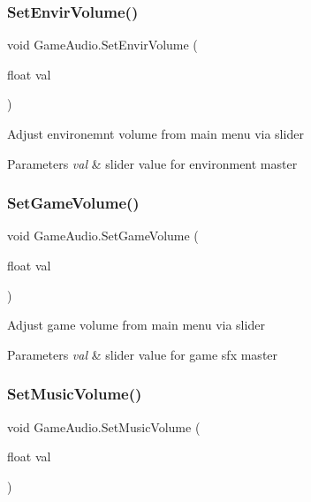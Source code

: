 \mbox{\label{class_game_audio_a14e235b89f31093cc9ea989317d5b6c7}} 
\subsubsection{\texorpdfstring{Set\+Envir\+Volume()}{SetEnvirVolume()}}
{\footnotesize\ttfamily void Game\+Audio.\+Set\+Envir\+Volume (\begin{DoxyParamCaption}\item[{float}]{val }\end{DoxyParamCaption})}



Adjust environemnt volume from main menu via slider 
\begin{DoxyParams}{Parameters}
{\em val} & slider value for environment master\\
\hline
\end{DoxyParams}


\mbox{\label{class_game_audio_a0939014f5a2245d81d78829ad8b9c159}} 
\subsubsection{\texorpdfstring{Set\+Game\+Volume()}{SetGameVolume()}}
{\footnotesize\ttfamily void Game\+Audio.\+Set\+Game\+Volume (\begin{DoxyParamCaption}\item[{float}]{val }\end{DoxyParamCaption})}



Adjust game volume from main menu via slider 
\begin{DoxyParams}{Parameters}
{\em val} & slider value for game sfx master\\
\hline
\end{DoxyParams}


\mbox{\label{class_game_audio_a25c3d80bd38854c5e41a3dce1a9300a8}} 
\subsubsection{\texorpdfstring{Set\+Music\+Volume()}{SetMusicVolume()}}
{\footnotesize\ttfamily void Game\+Audio.\+Set\+Music\+Volume (\begin{DoxyParamCaption}\item[{float}]{val }\end{DoxyParamCaption})}



